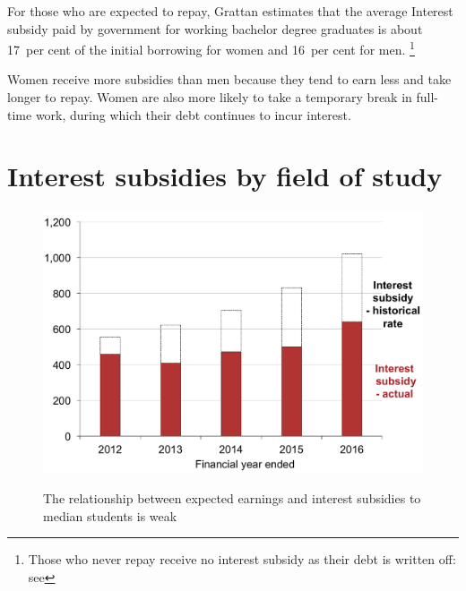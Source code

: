 \documentclass[embargoed]{grattan}
\begin{document}
For those who are expected to repay, Grattan estimates that the average \gls{Interest subsidy} paid by government for working bachelor degree graduates is about 17~per cent of the initial borrowing for women and 16~per cent for men.%
\footnote{Those who never repay receive no interest subsidy as their debt is written off: see }

Women receive more subsidies than men because they tend to earn less and take longer to repay.
Women are also more likely to take a temporary break in full-time work, during which their debt continues to incur interest.

\section{Interest subsidies by field of study}\label{interest-subsidies-by-field-of-study}

\begin{figure}
\caption{The relationship between expected earnings and interest subsidies to median students is weak}\label{fig:fig9-relationship-expected-earnings-interest-subsides-to-median-students-weak}

\includegraphics[page=9]{atlas/Chartpack.pdf}

%
{\textcites{DET2015FundingClusters}{ABS2012Censuspopulationhousing}}
\end{figure}
\end{document}
